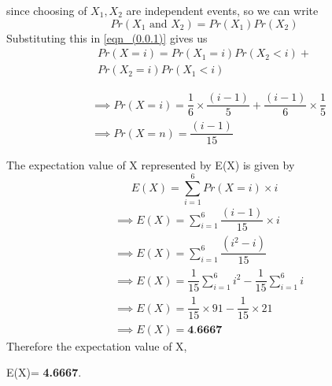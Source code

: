 \documentclass[a4paper]{article}
\begin{document}
\begin{multicols*}{2}
since choosing of $X_1,X_2$ are independent events, so we can write 
$$Pr(X_1 \text{ and }X_2)=Pr(X_1)Pr(X_2)$$
Substituting this in \eqref{eqn_(0.0.1)} gives us
\begin{multline}
Pr(X=i)=Pr(X_1=i)Pr(X_2<i)+\\
Pr(X_2=i)Pr(X_1<i)
\end{multline}

\begin{align}
& \implies Pr(X=i)=\dfrac{1}{6}\times \dfrac{(i-1)}{5}+\dfrac{(i-1)}{6} \times\dfrac{1}{5}\\
& \implies Pr(X=n)=\dfrac{(i-1)}{15}
\end{align}

The expectation value of X represented by E(X) is given by
$$E(X)=\sum_{i=1}^{6} Pr(X=i)\times i$$
\begin{align}
& \implies E(X)=\sum_{i=1}^{6} \dfrac{(i-1)}{15}\times i\\
& \implies E(X)=\sum_{i=1}^{6} \dfrac{(i^2-i)}{15}\\
& \implies E(X)=\dfrac{1}{15} \sum_{i=1}^{6} i^2-\dfrac{1}{15}\sum_{i=1}^{6} i\\
& \implies E(X)=\dfrac{1}{15} \times 91-\dfrac{1}{15} \times 21\\
& \implies E(X)= \textbf{4.6667}
\end{align}
Therefore the expectation value of X, 

E(X)= \textbf{4.6667}.

\end{multicols*}
\end{document}
